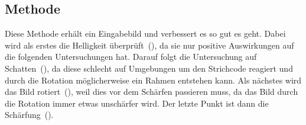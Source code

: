 \subsection*{Methode }
Diese Methode erhält ein Eingabebild und verbessert es so gut es geht.
Dabei wird als erstes die Helligkeit überprüft~(), da sie nur positive Auswirkungen auf die folgenden Untersuchungen hat.
Darauf folgt die Untersuchung auf Schatten~(), da diese schlecht auf Umgebungen um den Strichcode reagiert und durch die Rotation möglicherweise ein Rahmen entstehen kann.
Als nächstes wird das Bild rotiert~(), weil dies vor dem Schärfen passieren muss, da das Bild durch die Rotation immer etwas unschärfer wird.
Der letzte Punkt ist dann die Schärfung~().

